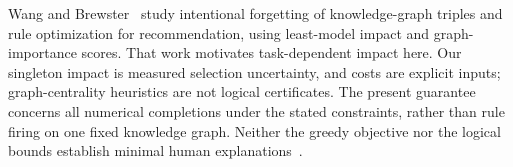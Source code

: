 Wang and Brewster~\citep{wang2024forgettingkgrs} study intentional forgetting of knowledge-graph triples and rule optimization for recommendation, using least-model impact and graph-importance scores. That work motivates task-dependent impact here. Our singleton impact is measured selection uncertainty, and costs are explicit inputs; graph-centrality heuristics are not logical certificates. The present guarantee concerns all numerical completions under the stated constraints, rather than rule firing on one fixed knowledge graph. Neither the greedy objective nor the logical bounds establish minimal human explanations~\citep{calautti2025globalnecessary}.
